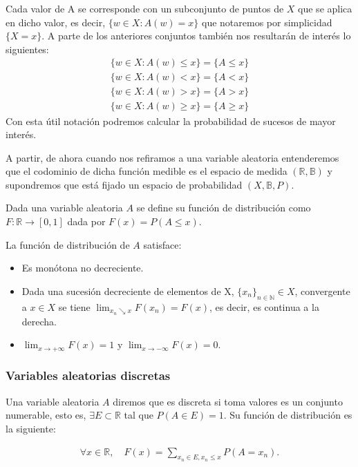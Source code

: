 \documentclass[../proyecto.tex]{memoir}
\begin{document}
Cada valor de A se corresponde con un subconjunto de puntos de $X$ que se aplica en dicho valor, es decir, $ \{ w\in X : A(w)=x\}$ que notaremos por simplicidad $\{X = x\}$. A parte de los anteriores conjuntos también nos resultarán de interés lo siguientes:
\begin{align*}
\{ w\in X : A(w) \leq x\} = \{ A \leq x \} \\
\{ w\in X : A(w) < x\} = \{ A < x \} \\
\{ w\in X : A(w) > x\} = \{ A > x \} \\
\{ w\in X : A(w) \geq x\} = \{ A \geq x \}
\end{align*}
Con esta útil notación podremos calcular la probabilidad de sucesos de mayor interés.

A partir, de ahora cuando nos refiramos a una variable aleatoria entenderemos que el codominio de dicha función medible es el espacio de medida $(\mathds{R},\mathds{B})$ y supondremos que está fijado un espacio de probabilidad $(X, \mathds{B}, P)$.


Dada una variable aleatoria $A$ se define su función de distribución como $ F : \mathds{R} \rightarrow [0,1] $ dada por $F(x)=P(A \leq x)$.

La función de distribución de $A$ satisface:

\begin{itemize}
\item Es monótona no decreciente.
\item Dada una sucesión decreciente de elementos de X, $\{x_n\}_{n \in \mathds{N}} \in X$, convergente a $x\in X$ se tiene $\lim_{x_n \searrow x} F(x_n) = F(x)$, es decir, es continua a la derecha. 
\item $\lim_{x\to+\infty} F(x) = 1$ y $\lim_{x\to-\infty} F(x) = 0$.
\end{itemize}

\subsubsection{Variables aleatorias discretas}

Una variable aleatoria $A$ diremos que es discreta si toma valores es un conjunto numerable, esto es, $\exists E \subset \mathds{R}$ tal que $P(A \in E)=1$. Su función de distribución es la siguiente: 

\begin{align*}
\forall x\in \mathds{R}, \quad F(x) = \sum_{x_n\in E, x_n \leq x} P(A=x_n).
\end{align*}
\end{document}
